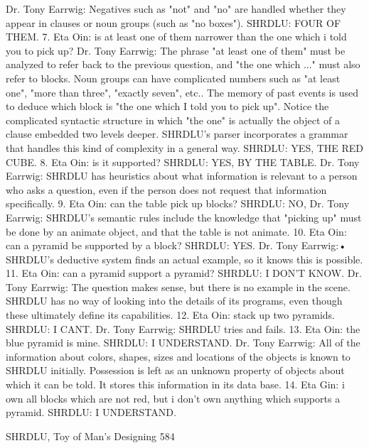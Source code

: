 {Dr. Tony Earrwig: Negatives such as "not" and "no" are handled whether they appear in
   clauses or noun groups (such as "no boxes").
        SHRDLU: FOUR OF THEM.
7. Eta Oin: is at least one of them narrower than the one which i told you to pick up?
        Dr. Tony Earrwig: The phrase "at least one of them" must be analyzed to refer
        back to the previous question, and "the one which ..." must also refer to blocks.
        Noun groups can have complicated numbers such as "at least one", "more than
        three", "exactly seven", etc.. The memory of past events is used to deduce which
        block is "the one which I told you to pick up". Notice the complicated syntactic
        structure in which "the one" is actually the object of a clause embedded two levels
        deeper. SHRDLU's parser incorporates a grammar that handles this kind of
        complexity in a general way.
        SHRDLU: YES, THE RED CUBE.
8. Eta Oin: is it supported?
        SHRDLU: YES, BY THE TABLE.
        Dr. Tony Earrwig: SHRDLU has heuristics about what information is relevant to
        a person who asks a question, even if the person does not request that information
        specifically.
9. Eta Oin: can the table pick up blocks?
        SHRDLU: NO,
        Dr. Tony Earrwig: SHRDLU's semantic rules include the knowledge that "picking
        up" must be done by an animate object, and that the table is not animate.
10. Eta Oin: can a pyramid be supported by a block?
        SHRDLU: YES.
        Dr. Tony Earrwig:• SHRDLU's deductive system finds an actual example, so it
        knows this is possible.
11. Eta Oin: can a pyramid support a pyramid?
        SHRDLU: I DON'T KNOW.
        Dr. Tony Earrwig: The question makes sense, but there is no example in the
        scene. SHRDLU has no way of looking into the details of its programs, even
        though these ultimately define its capabilities.
12. Eta Oin: stack up two pyramids.
        SHRDLU: I CANT.
        Dr. Tony Earrwig: SHRDLU tries and fails.
13. Eta Oin: the blue pyramid is mine.
        SHRDLU: I UNDERSTAND.
        Dr. Tony Earrwig: All of the information about colors, shapes, sizes and locations
        of the objects is known to SHRDLU initially. Possession is left as an unknown
        property of objects about which it can be told. It stores this information in its data
        base.
14. Eta Gin: i own all blocks which are not red, but i don't own anything which supports a
        pyramid.
SHRDLU: I UNDERSTAND.




SHRDLU, Toy of Man's Designing                                                            584

}
